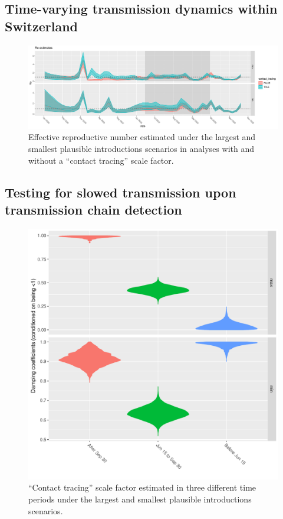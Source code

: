 \documentclass[9pt,twocolumn,twoside,lineno]{pnas-new}
\begin{document}
\subsection{Time-varying transmission dynamics within Switzerland}
\begin{figure}[tbhp]
\centering
\includegraphics[width=.8\linewidth]{figures/Re_noSampUB.pdf}
\caption{Effective reproductive number estimated under the largest and smallest plausible introductions scenarios in analyses with and without a ``contact tracing'' scale factor.}  
\label{fig:scale-factor}
\end{figure}

\subsection{Testing for slowed transmission upon transmission chain detection}

\begin{figure}[tbhp]
\centering
\includegraphics[width=.8\linewidth]{figures/CT_conditionedDamping_noSampUB.pdf}
\caption{``Contact tracing'' scale factor estimated in three different time periods under the largest and smallest plausible introductions scenarios.}  
\label{fig:scale-factor}
\end{figure}
\end{document}
